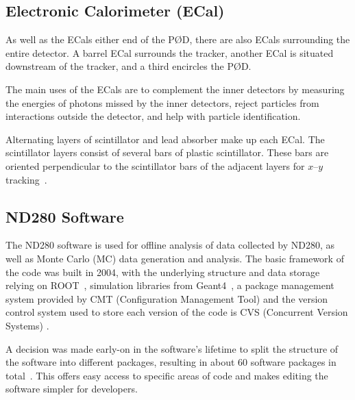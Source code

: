 \documentclass[aps,pra,12pt,notitlepage,tightenlines]{revtex4-1}
\begin{document}
\subsection{Electronic Calorimeter (ECal)}
As well as the ECals either end of the P\O D, there are also ECals surrounding the entire detector. A barrel ECal surrounds the tracker, another ECal is situated downstream of the tracker, and a third encircles the P\O D. %

The main uses of the ECals are to complement the inner detectors by measuring the energies of photons missed by the inner detectors, reject particles from interactions outside the detector, and help with particle identification.

Alternating layers of scintillator and lead absorber make up each ECal. The scintillator layers consist of several bars of plastic scintillator. These bars are oriented perpendicular to the scintillator bars of the adjacent layers for $x$--$y$ tracking~\cite{ABE2011106, Allan:2013ofa}.

\subsection{ND280 Software}
The ND280 software is used for offline analysis of data collected by ND280, as well as Monte Carlo (MC) data generation and analysis. The basic framework of the code was built in 2004, with the underlying structure and data storage relying on ROOT~\cite{Brun1997}, simulation libraries from Geant4~\cite{Agostinelli2003}, a package management system provided by CMT (Configuration Management Tool) \cite{Arnault:2000vu} and the version control system used to store each version of the code is CVS (Concurrent Version Systems) \cite{Berliner2001}.

A decision was made early-on in the software's lifetime to split the structure of the software into different packages, resulting in about 60 software packages in total~\cite{ABE2011106}. This offers easy access to specific areas of code and makes editing the software simpler for developers. 
\end{document}
